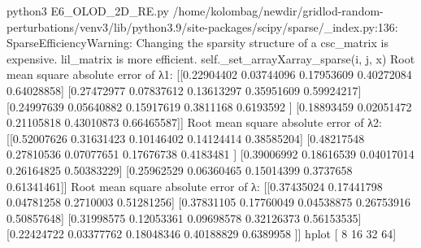 python3 E6_OLOD_2D_RE.py
/home/kolombag/newdir/gridlod-random-perturbations/venv3/lib/python3.9/site-packages/scipy/sparse/_index.py:136: SparseEfficiencyWarning: Changing the sparsity structure of a csc_matrix is expensive. lil_matrix is more efficient.
  self._set_arrayXarray_sparse(i, j, x)
Root mean square absolute error of λ1:
 [[0.22904402 0.03744096 0.17953609 0.40272084 0.64028858]
 [0.27472977 0.07837612 0.13613297 0.35951609 0.59924217]
 [0.24997639 0.05640882 0.15917619 0.3811168  0.6193592 ]
 [0.18893459 0.02051472 0.21105818 0.43010873 0.66465587]]
Root mean square absolute error of λ2: 
 [[0.52007626 0.31631423 0.10146402 0.14124414 0.38585204]
 [0.48217548 0.27810536 0.07077651 0.17676738 0.4183481 ]
 [0.39006992 0.18616539 0.04017014 0.26164825 0.50383229]
 [0.25962529 0.06360465 0.15014399 0.3737658  0.61341461]]
Root mean square absolute error of λ: 
 [[0.37435024 0.17441798 0.04781258 0.2710003  0.51281256]
 [0.37831105 0.17760049 0.04538875 0.26753916 0.50857648]
 [0.31998575 0.12053361 0.09698578 0.32126373 0.56153535]
 [0.22424722 0.03377762 0.18048346 0.40188829 0.6389958 ]]
hplot [ 8 16 32 64]